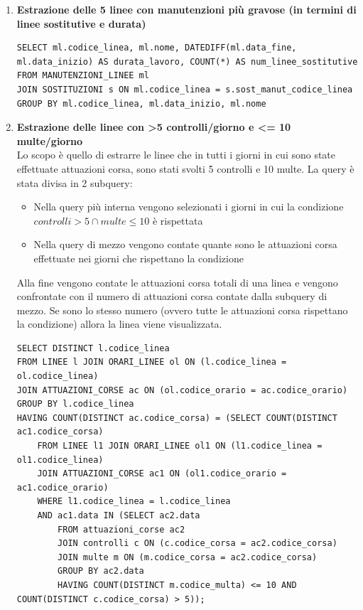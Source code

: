 \documentclass[12pt,a4paper]{report}
\begin{document}
\begin{enumerate}[label=\textbf{\arabic*)}]
\item \textbf{Estrazione delle 5 linee con manutenzioni più gravose (in termini di linee sostitutive e durata)} \\
\begin{lstlisting}[style=sqlstyle, caption=Query for Duration of Maintenance and Substitute Lines Count]
SELECT ml.codice_linea, ml.nome, DATEDIFF(ml.data_fine, ml.data_inizio) AS durata_lavoro, COUNT(*) AS num_linee_sostitutive
FROM MANUTENZIONI_LINEE ml
JOIN SOSTITUZIONI s ON ml.codice_linea = s.sost_manut_codice_linea
GROUP BY ml.codice_linea, ml.data_inizio, ml.nome
\end{lstlisting}

\item \textbf{Estrazione delle linee con \textgreater 5 controlli/giorno e \textless = 10 multe/giorno} \\
Lo scopo è quello di estrarre le linee che in tutti i giorni in cui sono state effettuate attuazioni corsa, sono stati svolti 5 controlli e 10 multe.
La query è stata divisa in 2 subquery:
\begin{itemize}
  \item Nella query più interna vengono selezionati i giorni in cui la condizione $ controlli > 5  \cap multe \leq 10  $ è rispettata
  \item Nella query di mezzo vengono contate quante sono le attuazioni corsa effettuate nei giorni che rispettano la condizione
\end{itemize}
Alla fine vengono contate le attuazioni corsa totali di una linea e vengono confrontate con il numero di attuazioni corsa contate dalla subquery di mezzo. Se sono lo stesso numero (ovvero tutte le attuazioni corsa rispettano la condizione) allora la linea viene visualizzata.
\begin{lstlisting}[style=sqlstyle, caption=Query to Find Lines Matching Fine/Control Conditions on All Trips]
SELECT DISTINCT l.codice_linea
FROM LINEE l JOIN ORARI_LINEE ol ON (l.codice_linea = ol.codice_linea)
JOIN ATTUAZIONI_CORSE ac ON (ol.codice_orario = ac.codice_orario)
GROUP BY l.codice_linea
HAVING COUNT(DISTINCT ac.codice_corsa) = (SELECT COUNT(DISTINCT ac1.codice_corsa)
    FROM LINEE l1 JOIN ORARI_LINEE ol1 ON (l1.codice_linea = ol1.codice_linea)
    JOIN ATTUAZIONI_CORSE ac1 ON (ol1.codice_orario = ac1.codice_orario)
    WHERE l1.codice_linea = l.codice_linea
    AND ac1.data IN (SELECT ac2.data
        FROM attuazioni_corse ac2
        JOIN controlli c ON (c.codice_corsa = ac2.codice_corsa)
        JOIN multe m ON (m.codice_corsa = ac2.codice_corsa)
        GROUP BY ac2.data
        HAVING COUNT(DISTINCT m.codice_multa) <= 10 AND COUNT(DISTINCT c.codice_corsa) > 5));
\end{lstlisting}


\end{enumerate}
\end{document}
